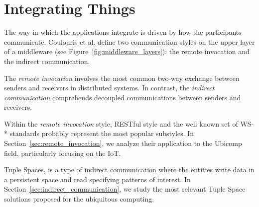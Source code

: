 \section{Integrating Things}
\label{sec:integration}

% 
%

The way in which the applications integrate is driven by how the participants communicate.
Coulouris et al. \cite{coulouris_distributed_2012} define two communication styles on the upper layer of a middleware (see Figure~\ref{fig:middleware_layers}): %
the remote invocation and the indirect communication.



The \emph{remote invocation} involves the most common two-way exchange between senders and receivers in distributed systems.
In contrast, the \emph{indirect communication} comprehends decoupled communications between senders and receivers.


Within the \emph{remote invocation} style, RESTful style \cite{fielding_architectural_2000} and the well known set of WS-* \cite{alonso_web_2010} standards probably represent the most popular substyles.
In Section~\ref{sec:remote_invocation}, we analyze their application to the Ubicomp field, particularly focusing on the IoT.


Tuple Spaces, is a type of indirect communication where the entities write data in a persistent space and read specifying patterns of interest.
In Section~\ref{sec:indirect_communication}, we study the most relevant Tuple Space solutions proposed for the ubiquitous computing.



